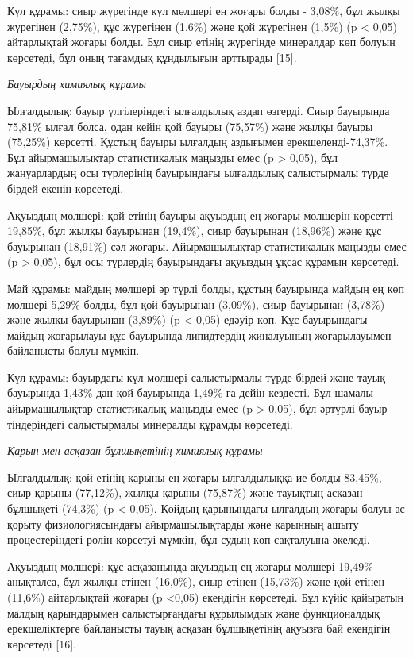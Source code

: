 \begin{multicols}{2}
Күл құрамы: сиыр жүрегінде күл мөлшері ең жоғары болды - 3,08\%, бұл
жылқы жүрегінен (2,75\%), құс жүрегінен (1,6\%) және қой жүрегінен
(1,5\%) (p \textless{} 0,05) айтарлықтай жоғары болды. Бұл сиыр етінің
жүрегінде минералдар көп болуын көрсетеді, бұл оның тағамдық құндылығын
арттырады {[}15{]}.

\emph{Бауырдың химиялық құрамы}

Ылғалдылық: бауыр үлгілеріндегі ылғалдылық аздап өзгерді. Сиыр бауырында
75,81\% ылғал болса, одан кейін қой бауыры (75,57\%) және жылқы бауыры
(75,25\%) көрсетті. Құстың бауыры ылғалдың аздығымен
ерекшеленді-74,37\%. Бұл айырмашылықтар статистикалық маңызды емес (p
\textgreater{} 0,05), бұл жануарлардың осы түрлерінің бауырындағы
ылғалдылық салыстырмалы түрде бірдей екенін көрсетеді.

Ақуыздың мөлшері: қой етінің бауыры ақуыздың ең жоғары мөлшерін көрсетті
- 19,85\%, бұл жылқы бауырынан (19,4\%), сиыр бауырынан (18,96\%) және
құс бауырынан (18,91\%) сәл жоғары. Айырмашылықтар статистикалық маңызды
емес (p \textgreater{} 0,05), бұл осы түрлердің бауырындағы ақуыздың
ұқсас құрамын көрсетеді.

Май құрамы: майдың мөлшері әр түрлі болды, құстың бауырында майдың ең
көп мөлшері 5,29\% болды, бұл қой бауырынан (3,09\%), сиыр бауырынан
(3,78\%) және жылқы бауырынан (3,89\%) (p \textless{} 0,05) едәуір көп.
Құс бауырындағы майдың жоғарылауы құс бауырында липидтердің жиналуының
жоғарылауымен байланысты болуы мүмкін.

Күл құрамы: бауырдағы күл мөлшері салыстырмалы түрде бірдей және тауық
бауырында 1,43\%-дан қой бауырында 1,49\%-ға дейін кездесті. Бұл шамалы
айырмашылықтар статистикалық маңызды емес (p \textgreater{} 0,05), бұл
әртүрлі бауыр тіндеріндегі салыстырмалы минералды құрамды көрсетеді.

\emph{Қарын мен асқазан бұлшықетінің химиялық құрамы}

Ылғалдылық: қой етінің қарыны ең жоғары ылғалдылыққа ие болды-83,45\%,
сиыр қарыны (77,12\%), жылқы қарыны (75,87\%) және тауықтың асқазан
бұлшықеті (74,3\%) (p \textless{} 0,05). Қойдың қарынындағы ылғалдың
жоғары болуы ас қорыту физиологиясындағы айырмашылықтарды және қарынның
ашыту процестеріндегі рөлін көрсетуі мүмкін, бұл судың көп сақталуына
әкеледі.

Ақуыздың мөлшері: құс асқазанында ақуыздың ең жоғары мөлшері 19,49\%
анықталса, бұл жылқы етінен (16,0\%), сиыр етінен (15,73\%) және қой
етінен (11,6\%) айтарлықтай жоғары (p \textless0,05) екендігін
көрсетеді. Бұл күйіс қайыратын малдың қарындарымен салыстырғандағы
құрылымдық және функционалдық ерекшеліктерге байланысты тауық асқазан
бұлшықетінің ақуызға бай екендігін көрсетеді {[}16{]}.


\end{multicols}
